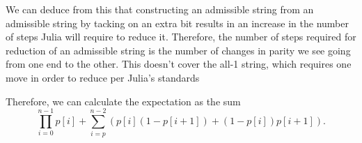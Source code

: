 \documentclass{article}
\begin{document}
We can deduce from this that constructing an admissible string from an admissible string by tacking on an extra bit results in an increase in the number of steps Julia will require to reduce it. Therefore, the number of steps required for reduction of an admissible string is the number of changes in parity we see going from one end to the other. This doesn't cover the all-1 string, which requires one move in order to reduce per Julia's standards

Therefore, we can calculate the expectation as the sum
\[\prod_{i=0}^{n-1}p[i] + \sum_{i=p}^{n-2}\left(p[i](1-p[i+1]) + (1 - p[i])p[i+1]\right).\]
\end{document}
